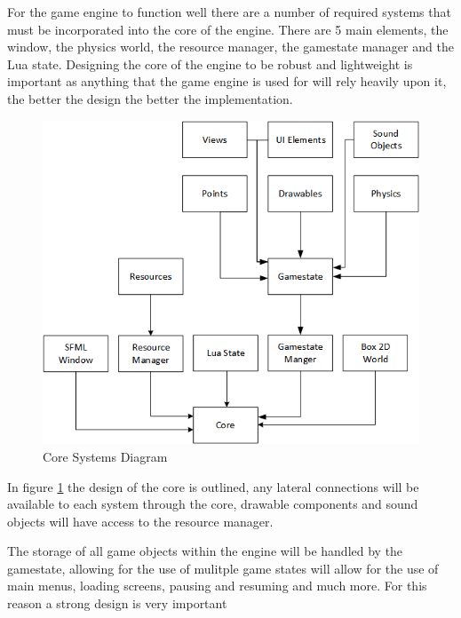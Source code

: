 \documentclass[11pt,a4paper,titlepage]{report}
\begin{document}
	For the game engine to function well there are a number of required systems that must be incorporated into the core of the engine. There are 5 main elements, the window, the physics world, the resource manager, the gamestate manager and the Lua state. Designing the core of the engine to be robust and lightweight is important as anything that the game engine is used for will rely heavily upon it, the better the design the better the implementation.

	\begin{figure}[h] 
		\centering
		\includegraphics[scale=0.75]{core1}
		\caption{Core Systems Diagram}
		\label{fig:CoreDiagram1}
	\end{figure}

	In figure \ref{fig:CoreDiagram1} the design of the core is outlined, any lateral connections will be available to each system through the core, drawable components and sound objects will have access to the resource manager.

	The storage of all game objects within the engine will be handled by the gamestate, allowing for the use of mulitple game states will allow for the use of main menus, loading screens, pausing and resuming and much more. For this reason a strong design is very important

	\singlespacing
	
	\onehalfspacing
\end{document}
